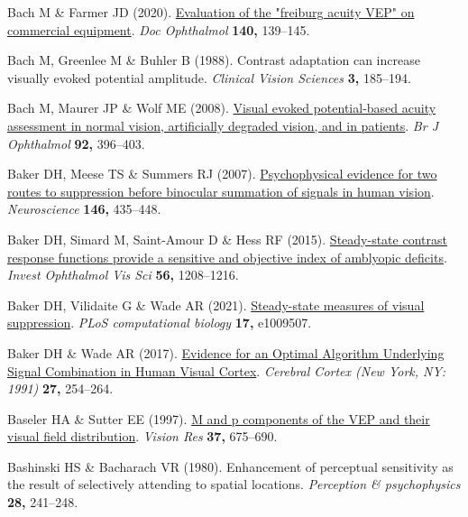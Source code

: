 \documentclass[
  letterpaper,
  DIV=11,
  numbers=noendperiod]{scrartcl}
\newlength{\cslhangindent}
\newenvironment{CSLReferences}[2] %
 {\begin{list}{}{%
  \setlength{\itemindent}{0pt}
  \setlength{\leftmargin}{0pt}
  \setlength{\parsep}{0pt}
  \ifodd #1
   \setlength{\leftmargin}{\cslhangindent}
   \setlength{\itemindent}{-1\cslhangindent}
  \fi
  \setlength{\itemsep}{#2\baselineskip}}}
 {\end{list}}
\begin{document}
\begin{CSLReferences}{1}{1}
Bach M \& Farmer JD (2020).
\href{https://doi.org/10.1007/s10633-019-09726-2}{Evaluation of the
"freiburg acuity VEP" on commercial equipment}. \emph{Doc Ophthalmol}
\textbf{140,} 139--145.

Bach M, Greenlee M \& Buhler B (1988). Contrast adaptation can increase
visually evoked potential amplitude. \emph{Clinical Vision Sciences}
\textbf{3,} 185--194.

Bach M, Maurer JP \& Wolf ME (2008).
\href{https://doi.org/10.1136/bjo.2007.130245}{Visual evoked
potential-based acuity assessment in normal vision, artificially
degraded vision, and in patients}. \emph{Br J Ophthalmol} \textbf{92,}
396--403.

Baker DH, Meese TS \& Summers RJ (2007).
\href{https://doi.org/10.1016/j.neuroscience.2007.01.030}{Psychophysical
evidence for two routes to suppression before binocular summation of
signals in human vision}. \emph{Neuroscience} \textbf{146,} 435--448.

Baker DH, Simard M, Saint-Amour D \& Hess RF (2015).
\href{https://doi.org/10.1167/iovs.14-15611}{Steady-state contrast
response functions provide a sensitive and objective index of amblyopic
deficits}. \emph{Invest Ophthalmol Vis Sci} \textbf{56,} 1208--1216.

Baker DH, Vilidaite G \& Wade AR (2021).
\href{https://doi.org/10.1371/journal.pcbi.1009507}{Steady-state
measures of visual suppression}. \emph{PLoS computational biology}
\textbf{17,} e1009507.

Baker DH \& Wade AR (2017).
\href{https://doi.org/10.1093/cercor/bhw395}{Evidence for an {Optimal}
{Algorithm} {Underlying} {Signal} {Combination} in {Human} {Visual}
{Cortex}}. \emph{Cerebral Cortex (New York, NY: 1991)} \textbf{27,}
254--264.

Baseler HA \& Sutter EE (1997).
\href{https://doi.org/10.1016/s0042-6989(96)00209-x}{M and p components
of the VEP and their visual field distribution}. \emph{Vision Res}
\textbf{37,} 675--690.

Bashinski HS \& Bacharach VR (1980). Enhancement of perceptual
sensitivity as the result of selectively attending to spatial locations.
\emph{Perception \& psychophysics} \textbf{28,} 241--248.


\end{CSLReferences}
\end{document}
